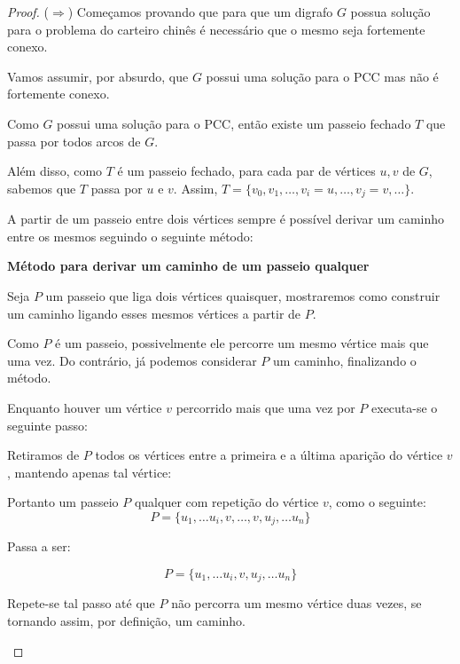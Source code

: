 \documentclass[12pt, a4paper]{article}
\begin{document}
    \begin{proof}


        ($\Rightarrow$) Começamos provando que para que um digrafo $G$ possua solução para o problema do carteiro chinês é necessário que o mesmo seja fortemente conexo.

        Vamos assumir, por absurdo, que $G$ possui uma solução para o PCC mas não é fortemente conexo.

        Como $G$ possui uma solução para o PCC, então existe um passeio fechado $T$ que passa por todos arcos de $G$.

         Além disso, como $T$ é um passeio fechado, para cada par de vértices $u, v$ de $G$, sabemos que $T$ passa por $u$ e $v$.
         Assim, $T = \{ v_0, v_1, \dots, v_i = u, \dots, v_j = v, \dots \}$.

        A partir de um passeio entre dois vértices sempre é possível derivar um caminho entre os mesmos seguindo o seguinte método:

        \begin{tcolorbox}
            \textbf{Método para derivar um caminho de um passeio qualquer}
            
            Seja $P$ um passeio que liga dois vértices quaisquer, mostraremos como construir um caminho ligando esses mesmos vértices a partir de $P$.

            Como $P$ é um passeio, possivelmente ele percorre um mesmo vértice mais que uma vez. Do contrário, já podemos considerar $P$ um caminho, finalizando o método. 

            Enquanto houver um vértice $v$ percorrido mais que uma vez por $P$ executa-se o seguinte passo:
    

            Retiramos de $P$ todos os vértices entre a primeira e a última aparição do vértice $v$, mantendo apenas tal vértice: 


            Portanto um passeio $P$ qualquer com repetição do vértice $v$, como o seguinte:
            \[
                P = \{ u_1, \dots u_i, v, \dots, v, u_j, \dots u_n\}
            \]

            Passa a ser:


            \[
                P = \{ u_1, \dots u_i, v, u_j, \dots u_n\}
            \]

            Repete-se tal passo até que $P$ não percorra um mesmo vértice duas vezes, se tornando assim, por definição, um caminho.

        \end{tcolorbox}
         

\end{proof}
\end{document}
